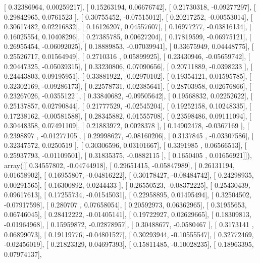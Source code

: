 \documentclass{article}
\begin{document}
       [ 0.32386964,  0.00259217],
       [ 0.15263194,  0.06676742],
       [ 0.21730318, -0.09277297],
       [ 0.29842965,  0.0761523 ],
       [ 0.30755452, -0.07515012],
       [ 0.20217252, -0.00553014],
       [ 0.30617482,  0.02216832],
       [ 0.16126207,  0.04557607],
       [ 0.16977277, -0.03816134],
       [ 0.16025554,  0.10408296],
       [ 0.27385785,  0.00627204],
       [ 0.17819599, -0.06975121],
       [ 0.26955454, -0.06092025],
       [ 0.18889853, -0.07039941],
       [ 0.33675949,  0.04448775],
       [ 0.25526717,  0.01564949],
       [ 0.2710316 ,  0.05899925],
       [ 0.23430946, -0.05659742],
       [ 0.20447325, -0.05039315],
       [ 0.33230806,  0.07090656],
       [ 0.20711889, -0.0398233 ],
       [ 0.24443803,  0.09195951],
       [ 0.33881922, -0.02970102],
       [ 0.19354121,  0.01595785],
       [ 0.32302169, -0.09286173],
       [ 0.22578731,  0.02385641],
       [ 0.28703958,  0.02676866],
       [ 0.23267026, -0.0355122 ],
       [ 0.33840682, -0.09505642],
       [ 0.19568832,  0.02252622],
       [ 0.25137857,  0.02790844],
       [ 0.21777529, -0.02545204],
       [ 0.19252158,  0.10248335],
       [ 0.17238162, -0.00581588],
       [ 0.28345882,  0.01555708],
       [ 0.23598486,  0.09111094],
       [ 0.30448358,  0.07491109],
       [ 0.21883972,  0.0028378 ],
       [ 0.14902478, -0.0367169 ],
       [ 0.2398897 , -0.01277105],
       [ 0.29998627, -0.08160206],
       [ 0.3137845 , -0.03307586],
       [ 0.32347572,  0.0250519 ],
       [ 0.30306596,  0.03101667],
       [ 0.3391985 ,  0.06566513],
       [ 0.25937793, -0.01109501],
       [ 0.31835375, -0.0882115 ],
       [ 0.1650405 ,  0.01656921]]), array([[ 0.34557802, -0.04744918],
       [ 0.29651415, -0.05847989],
       [ 0.26131194,  0.01658902],
       [ 0.16955807, -0.04816222],
       [ 0.30178427, -0.08484742],
       [ 0.24298935,  0.00291565],
       [ 0.16300892,  0.0244433 ],
       [ 0.26550523, -0.08372225],
       [ 0.25430439,  0.09617613],
       [ 0.17255734, -0.01545031],
       [ 0.22958895,  0.01495494],
       [ 0.32504502, -0.07917598],
       [ 0.280707  ,  0.07658054],
       [ 0.20592973,  0.06362965],
       [ 0.31955653,  0.06746045],
       [ 0.28412222, -0.01405141],
       [ 0.19722927,  0.02629665],
       [ 0.18309813, -0.01964968],
       [ 0.15959872, -0.02878957],
       [ 0.30488677, -0.0580467 ],
       [ 0.3173141 ,  0.06899073],
       [ 0.19119776, -0.04801527],
       [ 0.30293944, -0.10555547],
       [ 0.32772469, -0.02456019],
       [ 0.21823329,  0.04697393],
       [ 0.15811485, -0.10028235],
       [ 0.18963395,  0.07974137],
\end{document}
